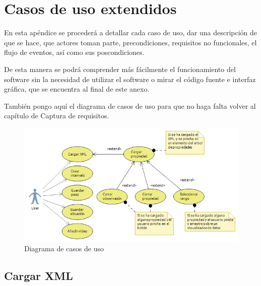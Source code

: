 \chapter{Casos de uso extendidos}
\label{chap:CasosDeUsoExt}
En esta ap\'endice se proceder\'a a detallar cada caso de uso, dar una descripci\'on
de que se hace, que actores toman parte, precondiciones, requisitos no funcionales, el flujo de
eventos, as\'i como sus poscondiciones.

De esta manera se podr\'a comprender m\'as f\'acilmente el funcionamiento del software
sin la necesidad de utilizar el software o mirar el c\'odigo fuente e interfaz gr\'afica,
que se encuentra al final de este anexo.

Tambi\'en pongo aqu\'i el diagrama de casos de uso para que no haga falta
volver al cap\'itulo de Captura de requisitos.

\begin{figure}[h]
	\centering
	\includegraphics[width=0.7\linewidth]{./Figures/useCaseDiagram.png}
	\caption[Diagrama de casos de uso]{Diagrama de casos de uso}
\end{figure}

\section{Cargar XML}

